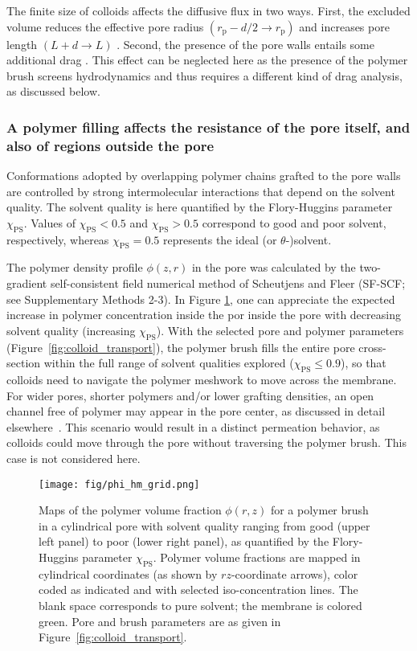 \documentclass[12pt, a4paper]{article}
\begin{document}
The finite size of colloids affects the diffusive flux in two ways.
First, the excluded volume reduces the effective pore radius $(r_{\text{p}} - d/2\rightarrow r_{\text{p}})$ and increases pore length $(L + d \rightarrow L)$ \cite{Renkin1954, Beck1970, Bungay1973, Anderson1974, Brenner1977}.
Second, the presence of the pore walls entails some additional drag \cite{Ladenburg1907, Faxen1922, Haberman1958}.
This effect can be neglected here as the presence of the polymer brush screens hydrodynamics and thus requires a different kind of drag analysis, as discussed below.


\subsubsection{A polymer filling affects the resistance of the pore itself, and also of regions outside the pore}

Conformations adopted by overlapping polymer chains grafted to the pore walls are controlled by strong intermolecular interactions that depend on the solvent quality.
The solvent quality is here quantified by the Flory-Huggins parameter $\chi_{\text{PS}}$.
Values of $\chi_{\text{PS}}<0.5$ and $\chi_{\text{PS}}>0.5$ correspond to good and poor solvent, respectively, whereas $\chi_{\text{PS}}=0.5$ represents the ideal (or $\theta$-)solvent.

The polymer density profile $\phi(z,r)$ in the pore was calculated by the two-gradient self-consistent field numerical method of Scheutjens and Fleer (SF-SCF; see Supplementary Methods 2-3).
In Figure \ref{fig:phi_hm_grid}, one can appreciate the expected increase in polymer concentration inside the por inside the pore with decreasing solvent quality (increasing $\chi_{\text{PS}}$).
With the selected pore and polymer parameters (Figure~\ref{fig:colloid_transport}), the polymer brush fills the entire pore cross-section within the full range of solvent qualities explored ($\chi_{\text{PS}}\le0.9$), so that colloids need to navigate the polymer meshwork to move across the membrane.
For wider pores, shorter polymers and/or lower grafting densities, an open channel free of polymer may appear in the pore center, as discussed in detail elsewhere~\cite{Laktionov2021}.
This scenario would result in a distinct permeation behavior, as colloids could move through the pore without traversing the polymer brush.
This case is not considered here.

\begin{figure}
    \centering
    \texttt{[image: fig/phi\_hm\_grid.png]}
    \caption{
    Maps of the polymer volume fraction $\phi(r,z)$ for a polymer brush in a cylindrical pore with solvent quality ranging from good (upper left panel) to poor (lower right panel), as quantified by the Flory-Huggins parameter $\chi_{\text{PS}}$.
    Polymer volume fractions are mapped in cylindrical coordinates (as shown by $rz$-coordinate arrows), color coded as indicated and with selected iso-concentration lines. The blank space corresponds to pure solvent; the membrane is colored green.
    Pore and brush parameters are as given in Figure~\ref{fig:colloid_transport}.
    }
    \label{fig:phi_hm_grid}
\end{figure}
\end{document}
